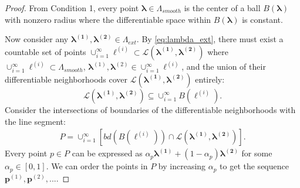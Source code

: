 \documentclass[10pt]{book}
\theoremstyle{definition}
\begin{document}
\begin{proof}
	From Condition 1, every point $\boldsymbol{\lambda}\in\Lambda_{smooth}$
	is the center of a ball $B(\boldsymbol{\lambda})$ with nonzero radius
	where the differentiable space within $B(\boldsymbol{\lambda})$ is
	constant.

	Now consider any $\boldsymbol{\lambda^{(1)}},\boldsymbol{\lambda^{(2)}}\in \Lambda_{ext}$.
	By \eqref{eq:lambda_ext}, there must exist a countable set of points $\cup_{i=1}^{\infty}\boldsymbol{\ell}^{(i)}
	\subset\mathcal{L}(\boldsymbol{\lambda^{(1)}},\boldsymbol{\lambda^{(2)}})$ where
	$\cup_{i=1}^{\infty} \boldsymbol{\ell}^{(i)} \subset \Lambda_{smooth}$,
	$\boldsymbol{\lambda}^{(1)},\boldsymbol{\lambda}^{(2)}\in \cup_{i=1}^{\infty}\boldsymbol{\ell}^{(i)}$,
	and the union of their differentiable neighborhoods cover $\mathcal{L}(\boldsymbol{\lambda^{(1)}},\boldsymbol{\lambda^{(2)}})$
	entirely: 
	\[
	\mathcal{L}\left(\boldsymbol{\lambda^{(1)}},\boldsymbol{\lambda^{(2)}}\right)\subseteq\cup_{i=1}^{\infty}B\left(\boldsymbol{\ell}^{(i)}\right).
	\]
	Consider the intersections of boundaries of the differentiable neighborhoods
	with the line segment: 
	\begin{align}
	P =
	\cup_{i=1}^{\infty}
	\left[
	bd \left (
	B\left(\boldsymbol{\ell}^{(i)}\right)
	\right )
	\cap\mathcal{L}(\boldsymbol{\lambda^{(1)}},\boldsymbol{\lambda^{(2)}})
	\right].
	\end{align}
	Every point $p\in P$ can be expressed as $\alpha_{p}\boldsymbol{\lambda^{(1)}}+(1-\alpha_{p})\boldsymbol{\lambda^{(2)}}$
	for some $\alpha_{p}\in[0,1]$.
	We can order the points in $P$ by increasing $\alpha_{p}$ to get the sequence $\boldsymbol{p}^{(1)},\boldsymbol{p}^{(2)},...$.


\end{proof}
\end{document}
